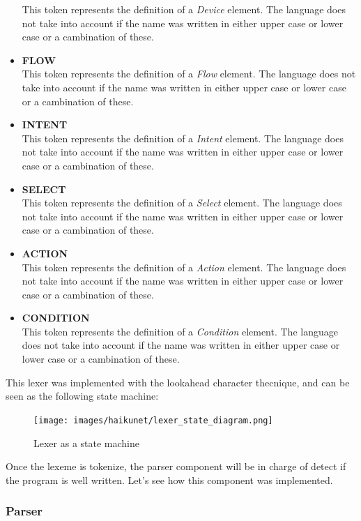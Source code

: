 \begin{itemize}
This token represents the definition of a \textit{Device} element. The language does not take into account if the name was written in either upper case or lower case or a cambination of these.
\item \textbf{FLOW}\\
This token represents the definition of a \textit{Flow} element. The language does not take into account if the name was written in either upper case or lower case or a cambination of these.
\item \textbf{INTENT}\\
This token represents the definition of a \textit{Intent} element. The language does not take into account if the name was written in either upper case or lower case or a cambination of these.
\item \textbf{SELECT}\\
This token represents the definition of a \textit{Select} element. The language does not take into account if the name was written in either upper case or lower case or a cambination of these.
\item \textbf{ACTION}\\
This token represents the definition of a \textit{Action} element. The language does not take into account if the name was written in either upper case or lower case or a cambination of these.
\item \textbf{CONDITION}\\
This token represents the definition of a \textit{Condition} element. The language does not take into account if the name was written in either upper case or lower case or a cambination of these.
\end{itemize}

This lexer was implemented with the lookahead character thecnique, and can be seen as the following state machine:

\begin{figure}[H]
\centering
\texttt{[image: images/haikunet/lexer\_state\_diagram.png]}
\caption{Lexer as a state machine}
\end{figure}

Once the lexeme is tokenize, the parser component will be in charge of detect if the program is well written. Let's see how this component was implemented.

\subsubsection{Parser}



